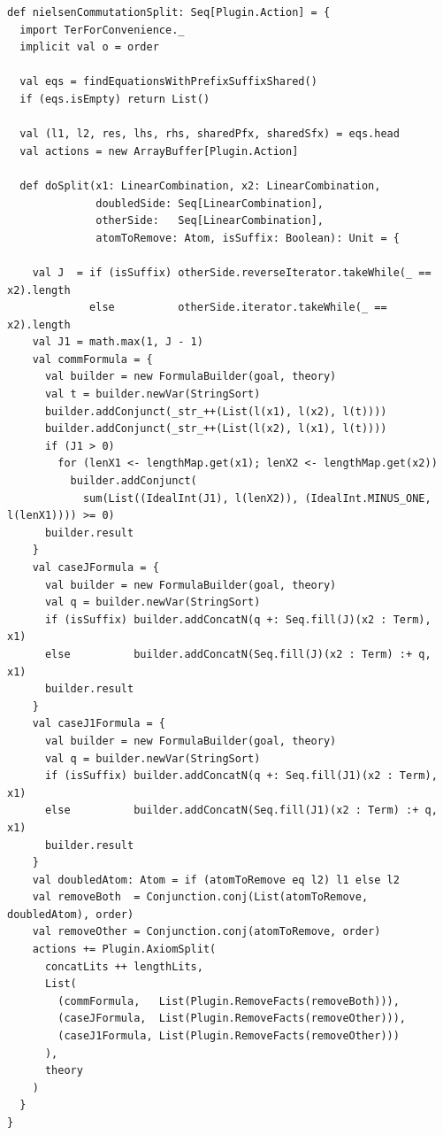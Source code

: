 \documentclass[14pt, russian]{scrartcl}
\begin{document}
\newpage
\begin{listing}[H]
\caption{Трёхветвевое разбиение по коммутации}
\label{lst:commsplit}
\begin{verbatim}
def nielsenCommutationSplit: Seq[Plugin.Action] = {
  import TerForConvenience._
  implicit val o = order

  val eqs = findEquationsWithPrefixSuffixShared()
  if (eqs.isEmpty) return List()

  val (l1, l2, res, lhs, rhs, sharedPfx, sharedSfx) = eqs.head
  val actions = new ArrayBuffer[Plugin.Action]

  def doSplit(x1: LinearCombination, x2: LinearCombination,
              doubledSide: Seq[LinearCombination],
              otherSide:   Seq[LinearCombination],
              atomToRemove: Atom, isSuffix: Boolean): Unit = {

    val J  = if (isSuffix) otherSide.reverseIterator.takeWhile(_ == x2).length
             else          otherSide.iterator.takeWhile(_ == x2).length
    val J1 = math.max(1, J - 1)
    val commFormula = {
      val builder = new FormulaBuilder(goal, theory)
      val t = builder.newVar(StringSort)
      builder.addConjunct(_str_++(List(l(x1), l(x2), l(t))))
      builder.addConjunct(_str_++(List(l(x2), l(x1), l(t))))
      if (J1 > 0)
        for (lenX1 <- lengthMap.get(x1); lenX2 <- lengthMap.get(x2))
          builder.addConjunct(
            sum(List((IdealInt(J1), l(lenX2)), (IdealInt.MINUS_ONE, l(lenX1)))) >= 0)
      builder.result
    }
    val caseJFormula = {
      val builder = new FormulaBuilder(goal, theory)
      val q = builder.newVar(StringSort)
      if (isSuffix) builder.addConcatN(q +: Seq.fill(J)(x2 : Term), x1)
      else          builder.addConcatN(Seq.fill(J)(x2 : Term) :+ q,  x1)
      builder.result
    }
    val caseJ1Formula = {
      val builder = new FormulaBuilder(goal, theory)
      val q = builder.newVar(StringSort)
      if (isSuffix) builder.addConcatN(q +: Seq.fill(J1)(x2 : Term), x1)
      else          builder.addConcatN(Seq.fill(J1)(x2 : Term) :+ q,  x1)
      builder.result
    }
    val doubledAtom: Atom = if (atomToRemove eq l2) l1 else l2
    val removeBoth  = Conjunction.conj(List(atomToRemove, doubledAtom), order)
    val removeOther = Conjunction.conj(atomToRemove, order)
    actions += Plugin.AxiomSplit(
      concatLits ++ lengthLits,
      List(
        (commFormula,   List(Plugin.RemoveFacts(removeBoth))),
        (caseJFormula,  List(Plugin.RemoveFacts(removeOther))),
        (caseJ1Formula, List(Plugin.RemoveFacts(removeOther)))
      ),
      theory
    )
  }
}
\end{verbatim}
\end{listing}
\end{document}

